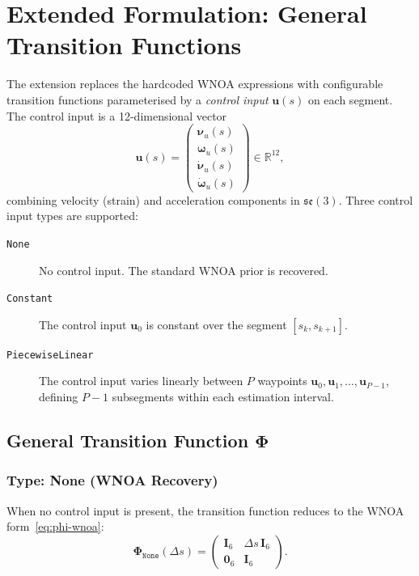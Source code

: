 \documentclass[11pt,a4paper]{article}
\newcommand{\se}{\mathfrak{se}(3)}
\newcommand{\R}{\mathbb{R}}
\newcommand{\bPhi}{\bm{\Phi}}
\newcommand{\bI}{\mathbf{I}}
\newcommand{\bzero}{\mathbf{0}}
\begin{document}
\section{Extended Formulation: General Transition Functions}
\label{sec:extended}

The extension replaces the hardcoded WNOA expressions with configurable transition functions parameterised by a \emph{control input} $\mathbf{u}(s)$ on each segment.
The control input is a 12-dimensional vector
\begin{equation}
    \mathbf{u}(s) = \begin{pmatrix} \bm{\nu}_u(s) \\ \bm{\omega}_u(s) \\ \dot{\bm{\nu}}_u(s) \\ \dot{\bm{\omega}}_u(s) \end{pmatrix} \in \R^{12},
\end{equation}
combining velocity (strain) and acceleration components in $\se$.
Three control input types are supported:

\begin{description}
    \item[\texttt{None}] No control input. The standard WNOA prior is recovered.
    \item[\texttt{Constant}] The control input $\mathbf{u}_0$ is constant over the segment $[s_k, s_{k+1}]$.
    \item[\texttt{PiecewiseLinear}] The control input varies linearly between $P$ waypoints $\mathbf{u}_0, \mathbf{u}_1, \ldots, \mathbf{u}_{P-1}$, defining $P{-}1$ subsegments within each estimation interval.
\end{description}

\subsection{General Transition Function \texorpdfstring{$\bPhi$}{Phi}}
\label{sec:general-phi}

\subsubsection{Type: None (WNOA Recovery)}
When no control input is present, the transition function reduces to the WNOA form~\eqref{eq:phi-wnoa}:
\begin{equation}
    \bPhi_{\texttt{None}}(\Delta s) = \begin{pmatrix} \bI_6 & \Delta s\,\bI_6 \\ \bzero_6 & \bI_6 \end{pmatrix}.
\end{equation}
\end{document}

